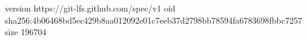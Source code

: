 version https://git-lfs.github.com/spec/v1
oid sha256:4b06468bd5ec429b8aa012092e01c7eeb37d2798bb78594fa6783698fbbc7257
size 196704
